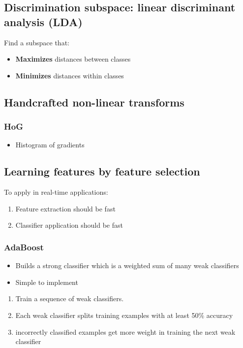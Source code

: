 \documentclass{article}
\begin{document}
    \subsection{Discrimination subspace: linear discriminant analysis (LDA)}
    Find a subspace that:
    \begin{itemize}
        \item \textbf{Maximizes} distances between classes
        \item \textbf{Minimizes} distances within classes
    \end{itemize}

    \subsection{Handcrafted non-linear transforms}
        \subsubsection{HoG}
        \begin{itemize}
            \item Histogram of gradients
        \end{itemize}

    \subsection{Learning features by feature selection}
    To apply in real-time applications:
    \begin{enumerate}
        \item Feature extraction should be fast
        \item Classifier application should be fast
    \end{enumerate}

        \subsubsection{AdaBoost}
        \begin{itemize}
            \item Builds a strong classifier which is a weighted sum of many weak classifiers
            \item Simple to implement
        \end{itemize}

        \begin{enumerate}
            \item Train a sequence of weak classifiers.
            \item Each weak classifier splits training examples with at least 50\% accuracy
            \item incorrectly classified examples get more weight in training the next weak classifier
        \end{enumerate}
\end{document}
